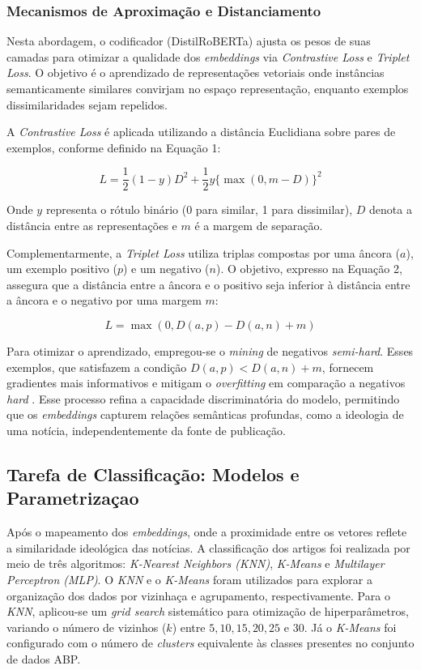 \subsubsection{Mecanismos de Aproximação e Distanciamento}\label{sec:funcoes}


Nesta abordagem, o codificador (DistilRoBERTa) ajusta os pesos de suas camadas para otimizar a 
qualidade dos \textit{embeddings} via \textit{Contrastive Loss} e \textit{Triplet Loss}. 
O objetivo é o aprendizado de representações vetoriais onde instâncias semanticamente similares convirjam no espaço representação, 
enquanto exemplos dissimilaridades sejam repelidos.

A \textit{Contrastive Loss} é aplicada utilizando a distância Euclidiana sobre pares de exemplos, conforme definido na Equação 1:

\begin{equation}
L = \frac{1}{2} (1-y) D^2 + \frac{1}{2} y \{ \max(0, m - D) \}^2
\end{equation}

Onde $y$ representa o rótulo binário (0 para similar, 1 para dissimilar), $D$ denota a distância entre as representações e $m$ é a margem de separação. 

Complementarmente, a \textit{Triplet Loss} utiliza triplas compostas por uma âncora ($a$), um exemplo positivo ($p$) e um negativo ($n$). 
O objetivo, expresso na Equação 2, assegura que a distância entre a âncora e o positivo seja inferior à distância entre a âncora e o negativo por uma margem $m$:

\begin{equation}
L = \max(0, D(a, p) - D(a, n) + m)
\end{equation}

Para otimizar o aprendizado, empregou-se o \textit{mining} de negativos \textit{semi-hard}. Esses exemplos, 
que satisfazem a condição $D(a, p) < D(a, n) + m$, fornecem gradientes mais informativos e 
mitigam o \textit{overfitting} em comparação a negativos \textit{hard} \cite{loss}. Esse processo 
refina a capacidade discriminatória do modelo, permitindo que os \textit{embeddings} 
capturem relações semânticas profundas, como a ideologia de uma notícia, independentemente da fonte de publicação.

\subsection{Tarefa de Classificação: Modelos e Parametrizaçao}\label{sec:classificacao}
Após o mapeamento dos \textit{embeddings}, onde a proximidade entre os vetores reflete a similaridade ideológica das notícias.
A classificação dos artigos foi realizada por meio de três algoritmos: \textit{K-Nearest Neighbors (KNN)}, \textit{K-Means} e
\textit{Multilayer Perceptron (MLP)}. O \textit{KNN} e o \textit{K-Means} foram utilizados para explorar a organização dos dados
por vizinhaça e agrupamento, respectivamente. Para o \textit{KNN}, aplicou-se um \textit{grid search} sistemático para otimização de hiperparâmetros, variando o número de vizinhos ($k$)
entre $5, 10, 15, 20, 25$ e $30$. Já o \textit{K-Means} foi configurado com o número de \textit{clusters} equivalente às classes
presentes no conjunto de dados ABP.

